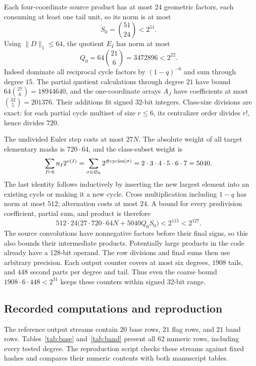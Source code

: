 Each four-coordinate source product has at most \(24\) geometric factors,
each consuming at least one tail unit, so its norm is at most
\[
                         S_0=\binom{51}{24}<2^{51}.
\]
Using \(\|D\|_1\le64\), the quotient \(E_I\) has norm at most
\[
             Q_0=64\binom{21}{6}=3472896<2^{22}.
\]
Indeed dominate all reciprocal cycle factors by \((1-q)^{-6}\) and
sum through degree \(15\). The partial quotient calculations through
degree \(21\) have bound \(64\binom{27}{6}=18944640\), and the
one-coordinate arrays \(A_J\) have coefficients at most
\(\binom{32}{5}=201376\). Their additions fit signed 32-bit integers.
Class-size divisions are exact: for each partial cycle multiset of
size \(r\le6\), its centralizer order divides \(r!\), hence divides \(720\).

The undivided Euler step costs at most \(27N\).
The absolute weight of all target elementary masks is \(720\cdot64\),
and the class-subset weight is
\[
 \sum_{I\vdash6}n_I2^{v(I)}
  =\sum_{\sigma\in\mathfrak S_6}2^{\#\text{cycles}(\sigma)}
  =2\cdot3\cdot4\cdot5\cdot6\cdot7=5040.
\]
The last identity follows inductively by inserting the new largest
element into an existing cycle or making it a new cycle.
Cross multiplication including \(1-q\) has norm at most \(512\);
alternation costs at most \(24\). A bound for every predivision
coefficient, partial sum, and product is therefore
\begin{equation}\label{eq:allbounds}
        512\cdot24\bigl(27\cdot720\cdot64N+5040Q_0S_0\bigr)
                         <2^{115}<2^{127}.
\end{equation}
The source convolutions have nonnegative factors before their final
signs, so this also bounds their intermediate products.
Potentially large products in the code already have a 128-bit operand.
The row divisions and final sums then use arbitrary precision.
Each output counter covers at most six degrees, \(1908\) tails, and
\(448\) second parts per degree and tail. Thus even the coarse bound
\(1908\cdot6\cdot448<2^{31}\) keeps these counters within signed
32-bit range.

\subsection{Recorded computations and reproduction}
The reference output streams contain \(20\) base rows, \(21\) flag rows,
and \(21\) band rows. Tables~\ref{tab:base} and~\ref{tab:band} present
all \(62\) numeric rows, including every tested degree. The reproduction
script checks these streams against fixed hashes and compares their
numeric contents with both manuscript tables.

